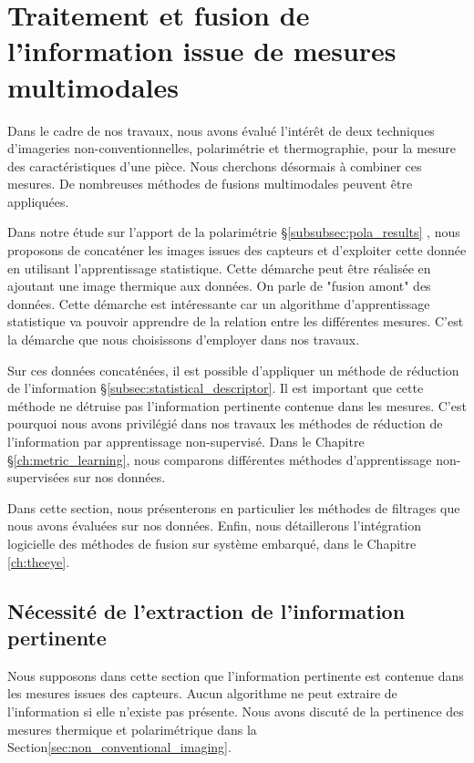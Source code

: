 \section{Traitement et fusion de l'information issue de mesures multimodales} \label{sec:multimodal}
Dans le cadre de nos travaux, nous avons évalué l'intérêt de deux techniques d'imageries non-conventionnelles, polarimétrie et thermographie, pour la mesure des caractéristiques d'une pièce.
Nous cherchons désormais à combiner ces mesures.
De nombreuses méthodes de fusions multimodales peuvent être appliquées.

Dans notre étude sur l'apport de la polarimétrie §\ref{subsubsec:pola_results} \cite{nagorny_polarimetric_2019}, nous proposons de concaténer les images issues des capteurs et d'exploiter cette donnée en utilisant l'apprentissage statistique.
Cette démarche peut être réalisée en ajoutant une image thermique aux données.
On parle de "fusion amont" des données.
Cette démarche est intéressante car un algorithme d'apprentissage statistique va pouvoir apprendre de la relation entre les différentes mesures.
C'est la démarche que nous choisissons d'employer dans nos travaux.

Sur ces données concaténées, il est possible d'appliquer un méthode de réduction de l'information §\ref{subsec:statistical_descriptor}.
Il est important que cette méthode ne détruise pas l'information pertinente contenue dans les mesures.
C'est pourquoi nous avons privilégié dans nos travaux les méthodes de réduction de l'information par apprentissage non-supervisé.
Dans le Chapitre §\ref{ch:metric_learning}, nous comparons différentes méthodes d'apprentissage non-supervisées sur nos données.

Dans cette section, nous présenterons en particulier les méthodes de filtrages que nous avons évaluées sur nos données.
Enfin, nous détaillerons l'intégration logicielle des méthodes de fusion sur système embarqué, dans le Chapitre \ref{ch:theeye}.

\subsection{Nécessité de l'extraction de l'information pertinente} \label{subsec:extraction}
Nous supposons dans cette section que l'information pertinente est contenue dans les mesures issues des capteurs.
Aucun algorithme ne peut extraire de l'information si elle n'existe pas présente.
Nous avons discuté de la pertinence des mesures thermique et polarimétrique dans la Section\ref{sec:non_conventional_imaging}.

